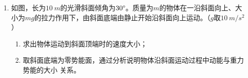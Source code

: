 \begin{enumerate}



\item 
如图，长为$ 10 \ m $的光滑斜面倾角为$ 30 \degree $。质量为$ m $的物体在一沿斜面向上、大小为$ mg $的拉力作用下，由斜面底端由静止开始沿斜面向上运动。（$ g $取$ 10 \ m/s^{2} $）
\begin{enumerate}
\item
求出物体运动到斜面顶端时的速度大小；
\item 
取斜面底端为零势能面，通过分析说明物体沿斜面运动过程中动能与重力势能的大小
关系。

\end{enumerate}
\begin{figure}[h!]
\flushright

\end{figure}





\end{enumerate}



